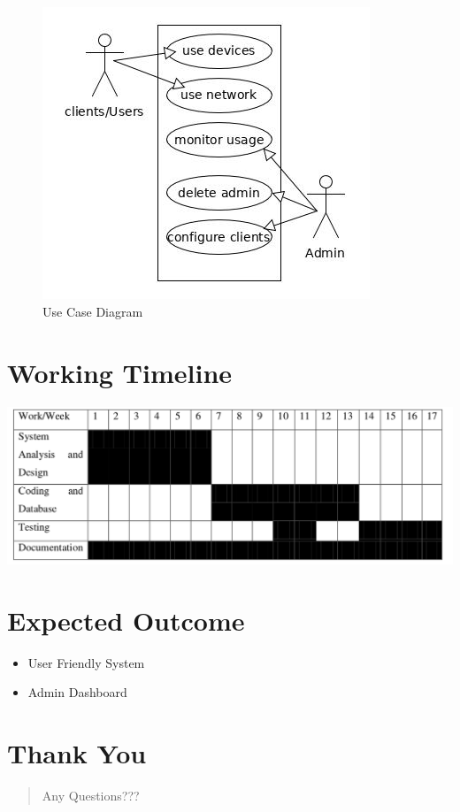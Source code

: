\documentclass[10pt,article,oneside]{memoir}
\begin{document}
\chapter*{}
\label{sec:org321656b}
\begin{figure}[htbp]
\centering
\includegraphics[width=.9\linewidth]{./diagrams/new.jpg}
\caption{Use Case Diagram}
\end{figure}


\chapter*{Working Timeline}
\label{sec:orgab19dfe}
\begin{center}
\includegraphics[width=.9\linewidth]{./diagrams/work-week.png}
\end{center}


\chapter*{Expected Outcome}
\label{sec:orgc000430}
\begin{itemize}
\item User Friendly System
\item Admin Dashboard
\end{itemize}


\chapter*{Thank You}
\label{sec:orgdcc0463}
\begin{quote}
Any Questions??? 
\end{quote}
\end{document}
